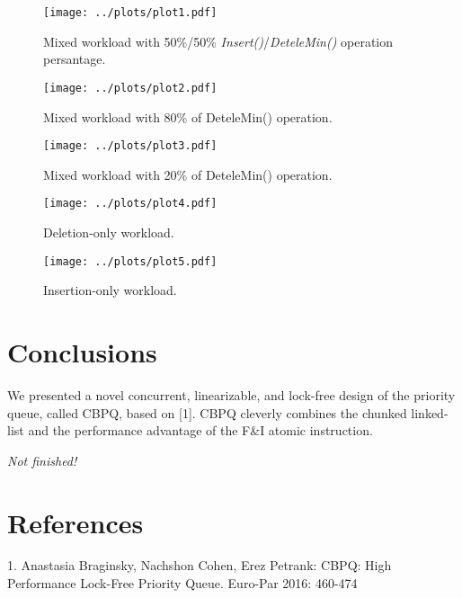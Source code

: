 \documentclass{article}
\begin{document}
\begin{figure}[H]
  \centering
  \texttt{[image: ../plots/plot1.pdf]}
  \caption{Mixed workload with 50\%/50\% \textit{Insert()}/\textit{DeteleMin()} operation persantage.}
  \label{fig:plot1}
\end{figure}

\begin{figure}[H]
  \centering
  \texttt{[image: ../plots/plot2.pdf]}
  \caption{Mixed workload with 80\% of DeteleMin() operation.}
  \label{fig:plot2}
\end{figure}

\begin{figure}[H]
  \centering
  \texttt{[image: ../plots/plot3.pdf]}
  \caption{Mixed workload with 20\% of DeteleMin() operation.}
  \label{fig:plot3}
\end{figure}

\begin{figure}[H]
  \centering
  \texttt{[image: ../plots/plot4.pdf]}
  \caption{Deletion-only workload.}
  \label{fig:plot4}
\end{figure}

\begin{figure}[H]
  \centering
  \texttt{[image: ../plots/plot5.pdf]}
  \caption{Insertion-only workload.}
  \label{fig:plot5}
\end{figure}

\section{Conclusions}\mbox{}\par
We presented a novel concurrent, linearizable, and lock-free design of the priority queue, called CBPQ, based on [1]. CBPQ cleverly combines the chunked linked-list and the performance advantage of the F\&I atomic instruction.
\begin{center}
\textit{Not finished!}
\end{center}

\section*{References}
1. Anastasia Braginsky, Nachshon Cohen, Erez Petrank: CBPQ: High Performance Lock-Free Priority Queue. Euro-Par 2016: 460-474
\end{document}
